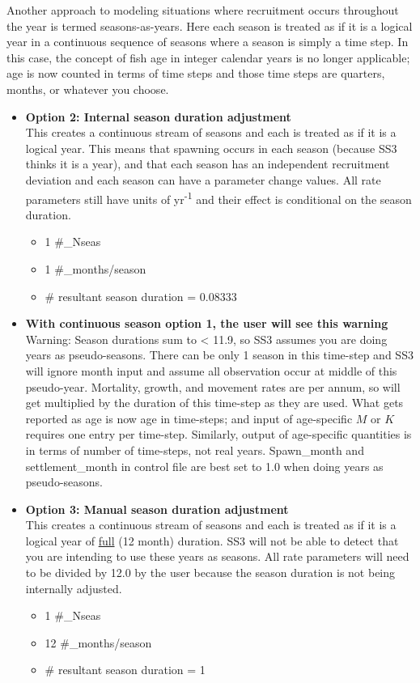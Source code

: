Another approach to modeling situations where recruitment occurs throughout the year is termed seasons-as-years. Here each season is treated as if it is a logical year in a continuous sequence of seasons where a season is simply a time step. In this case, the concept of fish age in integer calendar years is no longer applicable; age is now counted in terms of time steps and those time steps are quarters, months, or whatever you choose.
\begin{itemize}
	\item \textbf{Option 2: Internal season duration adjustment} \hypertarget{option2}{} \\
	 This creates a continuous stream of seasons and each is treated as if it is a logical year. This means that spawning occurs in each season (because SS3 thinks it is a year), and that each season has an independent recruitment deviation and each season can have a parameter change values. All rate parameters still have units of yr\textsuperscript{-1} and their effect is conditional on the season duration.
	 \begin{itemize}
		\item 1 \#\_Nseas
		\item 1 \#\_months/season
		\item \# resultant season duration = 0.08333
	\end{itemize}
	\item \textbf{With continuous season option 1, the user will see this warning} \\
	Warning: Season durations sum to < 11.9, so SS3 assumes you are doing years as pseudo-seasons. There can be only 1 season in this time-step and SS3 will ignore month input and assume all observation occur at middle of this pseudo-year. Mortality, growth, and movement rates are per annum, so will get multiplied by the duration of this time-step as they are used. What gets reported as age is now age in time-steps; and input of age-specific $M$ or $K$ requires one entry per time-step. Similarly, output of age-specific quantities is in terms of number of time-steps, not real years. Spawn\_month and settlement\_month in control file are best set to 1.0 when doing years as pseudo-seasons.
	\item \textbf{Option 3: Manual season duration adjustment} \hypertarget{option3}{} \\
	This creates a continuous stream of seasons and each is treated as if it is a logical year of \underline{full} (12 month) duration. SS3 will not be able to detect that you are intending to use these years as seasons. All rate parameters will need to be divided by 12.0 by the user because the season duration is not being internally adjusted.
	\begin{itemize}
		\item 1 \#\_Nseas
		\item 12 \#\_months/season
		\item \# resultant season duration = 1
	\end{itemize}
\end{itemize}

